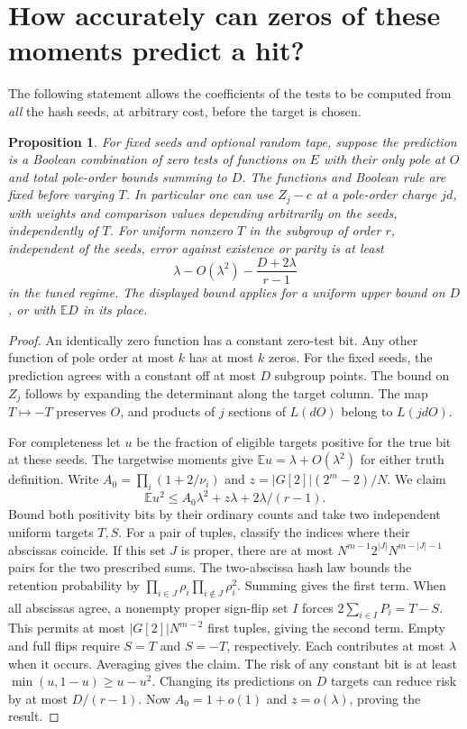 \documentclass[11pt]{article}
\newtheorem{proposition}{Proposition}
\newcommand{\E}{\mathbb E}
\begin{document}
\section{How accurately can zeros of these moments predict a hit?}

The following statement allows the coefficients of the tests to be computed
from \emph{all} the hash seeds, at arbitrary cost, before the target is chosen.

\begin{proposition}
For fixed seeds and optional random tape, suppose the prediction is a Boolean
combination of zero tests of functions on $E$ with their only pole at $O$
and total pole-order bounds summing to $D$. The functions and Boolean rule
are fixed before varying $T$. In particular one can use $Z_j-c$
at a pole-order charge $jd$, with weights and comparison values depending
arbitrarily on the seeds, independently of $T$. For uniform nonzero $T$
in the subgroup of order $r$, independent of the seeds, error against
existence or parity is at least
\[
 \lambda-O(\lambda^2)-\frac{D+2\lambda}{r-1}
\]
in the tuned regime. The displayed bound applies for a uniform upper bound
on $D$, or with $\E D$ in its place.
\end{proposition}

\begin{proof}
An identically zero function has a constant zero-test bit. Any other
function of pole order at most $k$ has at most $k$ zeros. For the fixed
seeds, the prediction agrees with a constant off at most $D$ subgroup
points. The bound on $Z_j$ follows by expanding the determinant along the
target column. The map $T\mapsto -T$ preserves $O$, and products of $j$
sections of $L(dO)$ belong to $L(jdO)$.

For completeness let $u$ be the fraction of eligible targets positive
for the true bit at these seeds. The targetwise moments give
$\E u=\lambda+O(\lambda^2)$ for either truth definition.
Write $A_0=\prod_i(1+2/\nu_i)$ and $z=|G[2]|(2^m-2)/N$.
We claim
\[
 \E u^2\le A_0\lambda^2+z\lambda+2\lambda/(r-1).
\]
Bound both positivity bits by their ordinary counts and take two independent
uniform targets $T,S$. For a pair of tuples, classify the indices where
their abscissas coincide. If this set $J$ is proper, there are at most
$N^{m-1}2^{|J|}N^{m-|J|-1}$ pairs for the two prescribed sums. The
two-abscissa hash law bounds the retention probability by
$\prod_{i\in J}\rho_i\prod_{i\notin J}\rho_i^2$. Summing gives the first
term. When all abscissas agree, a nonempty proper sign-flip set $I$
forces $2\sum_{i\in I}P_i=T-S$. This permits at most $|G[2]|N^{m-2}$
first tuples, giving the second term. Empty and full flips require
$S=T$ and $S=-T$, respectively. Each contributes at most $\lambda$
when it occurs. Averaging gives the claim. The risk of any constant bit
is at least $\min(u,1-u)\ge u-u^2$. Changing its predictions on $D$
targets can reduce risk by at most $D/(r-1)$. Now $A_0=1+o(1)$ and
$z=o(\lambda)$, proving the result.
\end{proof}
\end{document}
